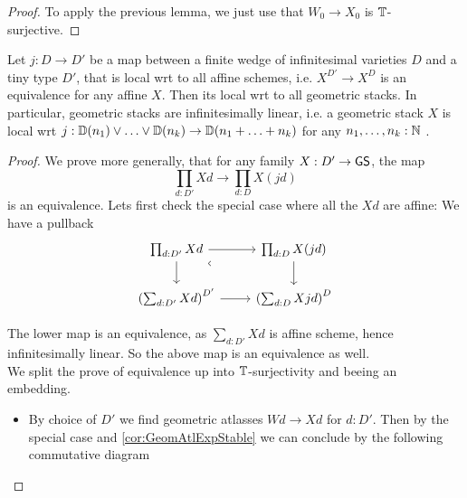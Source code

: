 \begin{proof}
	To apply the previous lemma, we just use that $W_0 \to X_0$ is $\mathbb{T}$-surjective.
\end{proof}
\begin{prop}
	Let $j : D \to D'$ be a map between a finite wedge of infinitesimal varieties $D$ and a tiny type $D'$, that is local wrt to all affine schemes, i.e. $X ^ {D'} \to X ^D$ is an equivalence for any affine $X$. Then its local wrt to all geometric stacks.
	In particular, geometric stacks are infinitesimally linear, i.e. a geometric stack $X$ is local wrt $j : \mathbb{D}(n_1) \lor \hdots \lor \mathbb{D}(n_k) \to \mathbb{D}(n_1+ \hdots + n_k)$ for any $n_1,\hdots,n_k : \mathbb{N}$ .
\end{prop}
\begin{proof}
We prove more generally, that for any family $X :D' \to \mathsf{GS}$, the map
\[
\prod_{d:D'} X d \to \prod_{d:D} X (j d) \tag{$\star$}
\]
is an equivalence. Lets first check the special case where all the $X d$ are affine: We have a pullback
\[\begin{tikzcd}
	{\prod_{d:D'} X d } & {\prod_{d:D} X (j d) } \\
	{\left (\sum_{d:D'}X d \right)^{D'}} & {\left (\sum_{d:D} X j d \right)^{D}}
	\arrow[from=1-1, to=1-2]
	\arrow[from=1-1, to=2-1]
	\arrow["\ulcorner"{anchor=center, pos=0.125, rotate=45}, draw=none, from=1-1, to=2-2]
	\arrow[from=1-2, to=2-2]
	\arrow[from=2-1, to=2-2]
\end{tikzcd}\]

The lower map is an equivalence, as $\sum_{d :D'} X d$ is affine scheme, hence infinitesimally linear. So the above map is an equivalence as well. \\
We split the prove of equivalence up into $\mathbb{T}$-surjectivity and beeing an embedding.
\begin{itemize}
	\item
By choice of $D'$ we find geometric atlasses $W d \to X d$ for $d :D'$.
Then by the special case and \ref{cor:GeomAtlExpStable} we can conclude by the following commutative diagram


\end{itemize}
\end{proof}
